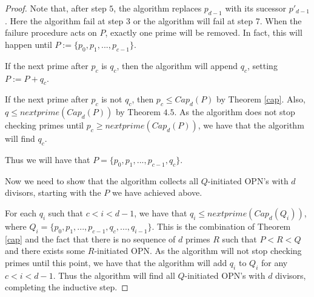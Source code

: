 \documentclass[../paper.tex]{subfiles}
\begin{document}
\begin{proof}
Note that, after step $5$, the algorithm replaces $p_{d-1}$ with
its sucessor $p'_{d - 1}$. Here the algorithm fail at step 3 or
the algorithm will fail at step 7. When the failure procedure acts
on $P$, exactly one prime will be removed. In fact, this will
happen until $P := \{p_0, p_1, ..., p_{c-1}\}$. 

If the next prime after $p_c$ is $q_c$, then the algorithm will
append $q_c$, setting $P := P + q_c$. 

If the next prime after $p_c$ is not $q_c$, then $p_c \leq
Cap_d(P)$ by Theorem {\ref{cap}}. Also, $q \leq
nextprime(Cap_d(P)) $ by Theorem $4.5$. As the algorithm does not
stop checking primes until $p_c \geq nextprime(Cap_d(P))$, we have
that the algorithm will find $q_c$. 

Thus we will have that $P = \{p_0, p_1, ..., p_{c-1}, q_c\}$.

Now we need to show that the algorithm collects all $Q$-initiated
OPN's with $d$ divisors, starting with the $P$ we have achieved
above.

For each $q_i$ such that $c < i < d - 1$, we have that $q_i \leq
nextprime(Cap_d(Q_i))$, where $Q_i = \{p_0, p_1, ..., p_{c-1},
q_c, ..., q_{i - 1}\}$. This is the combination of Theorem
{\ref{cap}} and the fact that there is no sequence of $d$ primes 
$R$ such that $P < R < Q$ and there exists some $R$-initiated
OPN. As the algorithm will not stop checking primes until this
point, we have that the algorithm will add $q_i$ to $Q_i$ for any
$c < i < d - 1$. Thus the algorithm will find all $Q$-initiated
OPN's with $d$ divisors, completing the inductive step.
\end{proof}
\end{document}
